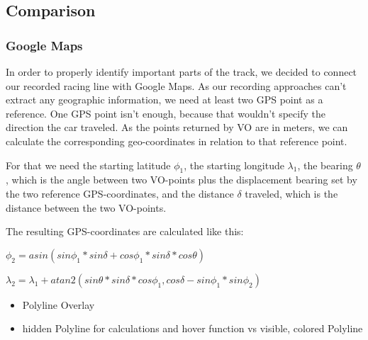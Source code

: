 \subsection{Comparison}
\subsubsection{Google Maps}
In order to properly identify important parts of the track, we decided to connect our recorded racing line with Google Maps. As our recording approaches can't extract any geographic information, we need at least two GPS point as a reference. One GPS point isn't enough, because that wouldn't specify the direction the car traveled. As the points returned by VO are in meters, we can calculate the corresponding geo-coordinates in relation to that reference point. 

For that we need the starting latitude $\phi_1$, the starting longitude $\lambda_1$, the bearing $\theta$, which is the angle between two VO-points plus the displacement bearing set by the two reference GPS-coordinates, and the distance $\delta$ traveled, which is the distance between the two VO-points.

The resulting GPS-coordinates are calculated like this:

$\phi_2 = asin(sin \phi_1 * sin \delta + cos \phi_1 * sin \delta * cos \theta)$

$\lambda_2 = \lambda_1 + atan2(sin \theta * sin \delta * cos \phi_1, cos \delta - sin \phi_1 * sin \phi_2)$

\begin{itemize}
	\item Polyline Overlay
	\item hidden Polyline for calculations and hover function vs visible, colored Polyline	
\end{itemize}
\clearpage